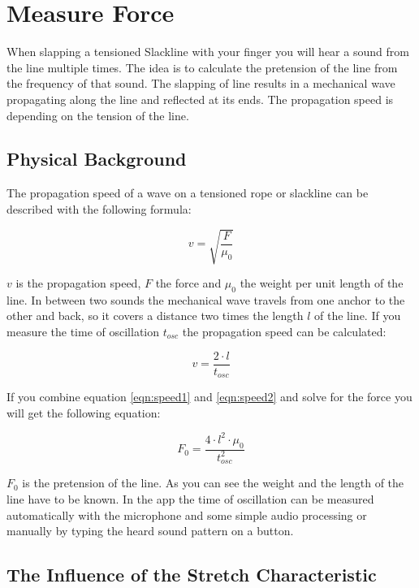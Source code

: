 \chapter{Measure Force}

When slapping a tensioned Slackline with your finger you will hear a sound from the line multiple times. The idea is to calculate the pretension of the line from the frequency of that sound. The slapping of line results in  a mechanical wave propagating along the line and reflected at its ends. The propagation speed is depending on the tension of the line.

\section{Physical Background}

The propagation speed of a wave on a tensioned rope or slackline can be described with the following formula:

\begin{equation}
v = \sqrt{\frac{F}{\mu_0}}
\label{eqn:speed1}
\end{equation}

$v$ is the propagation speed, $F$ the force and $\mu_0$ the weight per unit length of the line. In between two sounds the mechanical wave travels from one anchor to the other and back, so it covers a distance two times the length $l$ of the line. If you measure the time of oscillation $t_{osc}$ the propagation speed can be calculated:

\begin{equation}
	v = \frac{2\cdot l}{t_{osc}}
	\label{eqn:speed2}
\end{equation}

If you combine equation \ref{eqn:speed1} and \ref{eqn:speed2} and solve for the force you will get the following equation:

\begin{equation}
	F_0 = \frac{4\cdot l^2\cdot \mu_0}{t_{osc}^2}
	\label{eqn:measureForce}
\end{equation}

$F_0$ is the pretension of the line. As you can see the weight and the length of the line have to be known. In the app the time of oscillation can be measured automatically with the microphone and some simple audio processing or manually by typing the heard sound pattern on a button.

\section{The Influence of the Stretch Characteristic}

